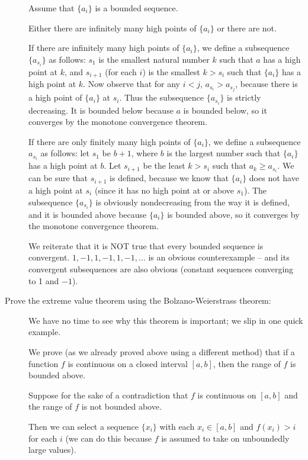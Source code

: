 \documentclass[12pt]{article}
\begin{document}
\begin{description}
Assume that $\{a_i\}$ is a bounded sequence.

Either there are infinitely many high points of $\{a_i\}$ or there are not.

If there are infinitely many high points of $\{a_i\}$, we define a subsequence $\{a_{s_i}\}$ as follows:  $s_1$ is the smallest natural number $k$ such that $a$ has a high point at $k$, and $s_{i+1}$ (for each $i$)
is the smallest $k>s_i$ such that $\{a_i\}$ has a high point at $k$.  Now observe that for any $i<j$, $a_{s_i}>a_{s_j}$, because there is a high point of $\{a_i\}$ at $s_i$.  Thus the subsequence $\{a_{s_i}\}$ is strictly decreasing.
It is bounded below because $a$ is bounded below, so it converges by the monotone convergence theorem.

If there are only finitely many high points of $\{a_i\}$, we define a subsequence $a_{s_i}$ as follows:  let $s_1$ be $b+1$, where $b$ is the largest number such that $\{a_i\}$ has a high point at $b$.  Let $s_{i+1}$
be the least $k>s_i$ such that $a_k\geq a_{s_i}$.  We can be sure that $s_{i+1}$ is defined, because we know that $\{a_i\}$ does not have a high point at $s_i$ (since it has no high point at or above $s_1$).  The subsequence
$\{a_{s_i}\}$ is obviously nondecreasing from the way it is defined, and it is bounded above because $\{a_i\}$ is bounded above, so it converges by the monotone convergence theorem.

We reiterate that it is NOT true that every bounded sequence is convergent.  $1,-1,1,-1,1, -1,\ldots$ is an obvious counterexample -- and its convergent subsequences are also obvious (constant sequences converging to 1 and $-1$).

\item[Prove the extreme value theorem using the Bolzano-Weierstrass theorem:]  
We have no time to see why this theorem is important; we slip in one quick example.

We prove (as we already proved above using a different method) that if a function $f$ is continuous on a closed interval $[a,b]$, then the range of $f$ is bounded above.

Suppose for the sake of a contradiction that $f$ is continuous on $[a,b]$ and the range of $f$ is not bounded above.

Then we can select a sequence $\{x_i\}$ with each $x_i \in [a,b]$ and $f(x_i)>i$ for each $i$ (we can do this because $f$ is assumed to take on unboundedly large values).


\end{description}
\end{document}
